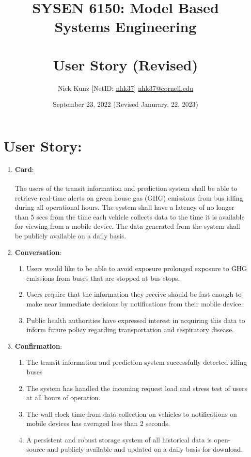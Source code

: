 \documentclass{article}
\begin{document}
\title{SYSEN 6150: Model Based Systems Engineering\\~\\
    \Large User Story (Revised)
}
\author{
    Nick Kunz [NetID: \url{nhk37}] \hyperlink{nhk37@cornell.edu}{nhk37@cornell.edu}}
\date{September 23, 2022 (Revised Janurary, 22, 2023)}
\maketitle
\thispagestyle{fancy}

\section*{User Story: }
\begin{enumerate}
    \item \textbf{Card}: \\~\\
        The users of the transit information and prediction system shall be able to retrieve real-time alerts on green house gas (GHG) emissions from bus idling during all operational hours. The system shall have a latency of no longer than 5 secs from the time each vehicle collects data to the time it is available for viewing from a mobile device. The data generated from the system shall be publicly available on a daily basis.
    \item \textbf{Conversation}:
    \begin{enumerate}
        \item Users would like to be able to avoid exposure prolonged exposure to GHG emissions from buses that are stopped at bus stops.
        \item Users require that the information they receive should be fast enough to make near immediate decisions by notifications from their mobile device.
        \item Public health authorities have expressed interest in acquiring this data to inform future policy regarding transportation and respiratory disease.
    \end{enumerate}
    \item \textbf{Confirmation}:
    \begin{enumerate}
        \item The transit information and prediction system successfully detected idling buses
        \item The system has handled the incoming request load and stress test of users at all hours of operation.
        \item The wall-clock time from data collection on vehicles to notifications on mobile devices has averaged less than 2 seconds.
        \item A persistent and robust storage system of all historical data is open-source and publicly available and updated on a daily basis for download. 
    \end{enumerate}
\end{enumerate}
\end{document}
